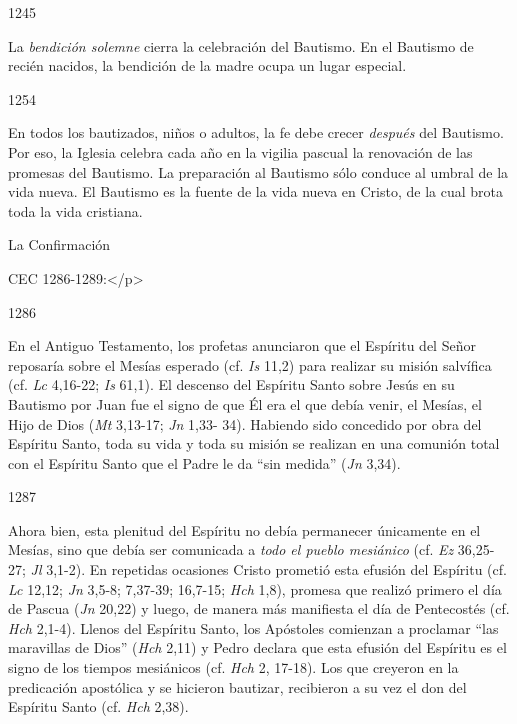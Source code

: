 			\begin{ccebody}\begin{ccenumber}1245\end{ccenumber} La \textit{bendición solemne} cierra la celebración del Bautismo. En el Bautismo de recién nacidos, la bendición de la madre ocupa un lugar especial.\end{ccebody}
			
			\begin{ccebody}\begin{ccenumber}1254\end{ccenumber} En todos los bautizados, niños o adultos, la fe debe crecer \textit{después} del Bautismo. Por eso, la Iglesia celebra cada año en la vigilia pascual la renovación de las promesas del Bautismo. La preparación al Bautismo sólo conduce al umbral de la vida nueva. El Bautismo es la fuente de la vida nueva en Cristo, de la cual brota toda la vida cristiana.\end{ccebody}
			
			\begin{ccetheme}La Confirmación \end{ccetheme}
			
			\begin{ccereference}\end{ccereference}CEC 1286-1289:</p>
			
			\begin{ccebody}\begin{ccenumber}1286\end{ccenumber} En el Antiguo Testamento, los profetas anunciaron que el Espíritu del Señor reposaría sobre el Mesías esperado (cf. \textit{Is} 11,2) para realizar su misión salvífica (cf. \textit{Lc} 4,16-22; \textit{Is} 61,1). El descenso del Espíritu Santo sobre Jesús en su Bautismo por Juan fue el signo de que Él era el que debía venir, el Mesías, el Hijo de Dios (\textit{Mt} 3,13-17; \textit{Jn} 1,33- 34). Habiendo sido concedido por obra del Espíritu Santo, toda su vida y toda su misión se realizan en una comunión total con el Espíritu Santo que el Padre le da “sin medida” (\textit{Jn} 3,34).\end{ccebody}
			
			\begin{ccebody}\begin{ccenumber}1287\end{ccenumber} Ahora bien, esta plenitud del Espíritu no debía permanecer únicamente en el Mesías, sino que debía ser comunicada a \textit{todo el pueblo mesiánico} (cf. \textit{Ez} 36,25-27; \textit{Jl} 3,1-2). En repetidas ocasiones Cristo prometió esta efusión del Espíritu (cf. \textit{Lc} 12,12; \textit{Jn} 3,5-8; 7,37-39; 16,7-15; \textit{Hch} 1,8), promesa que realizó primero el día de Pascua (\textit{Jn} 20,22) y luego, de manera más manifiesta el día de Pentecostés (cf. \textit{Hch} 2,1-4). Llenos del Espíritu Santo, los Apóstoles comienzan a proclamar “las maravillas de Dios” (\textit{Hch} 2,11) y Pedro declara que esta efusión del Espíritu es el signo de los tiempos mesiánicos (cf. \textit{Hch} 2, 17-18). Los que creyeron en la predicación apostólica y se hicieron bautizar, recibieron a su vez el don del Espíritu Santo (cf. \textit{Hch} 2,38).\end{ccebody}
			
